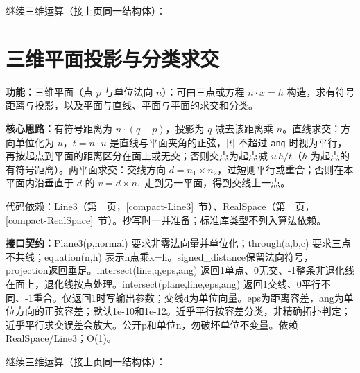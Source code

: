 

\newpage

\noindent 继续三维运算（接上页同一结构体）：



\section{三维平面投影与分类求交}\label{compact-Plane3}

\noindent\textbf{功能：}\allowbreak 三维平面（点 $p$ 与单位法向 $n$）：可由三点或方程 $n\cdot x=h$ 构造，求有符号距离与投影，以及平面与直线、平面与平面的求交和分类。

\textbf{核心思路：}\allowbreak 有符号距离为 $n\cdot(q-p)$，投影为 $q$ 减去该距离乘 $n$。直线求交：方向单位化为 $u$，$t=n\cdot u$ 是直线与平面夹角的正弦，$|t|$ 不超过 \texttt{ang} 时视为平行，再按起点到平面的距离区分在面上或无交；否则交点为起点减 $u\,h/t$（$h$ 为起点的有符号距离）。两平面求交：交线方向 $d=n_1\times n_2$，过短则平行或重合；否则在本平面内沿垂直于 $d$ 的 $v=d\times n_1$ 走到另一平面，得到交线上一点。

代码依赖：\hyperref[compact-Line3]{Line3}（第~\pageref{compact-Line3}~页，\ref{compact-Line3}~节）、\hyperref[compact-RealSpace]{RealSpace}（第~\pageref{compact-RealSpace}~页，\ref{compact-RealSpace}~节）。抄写时一并准备；标准库类型不列入算法依赖。

{\sloppy{}\noindent\textbf{接口契约：}Plane3(p,normal) 要求非零法向量并单位化；through(a,b,c) 要求三点不共线；equation(n,h) 表示n点乘x=h。signed\_distance保留法向符号，projection返回垂足。intersect(line,q,eps,ang) 返回1单点、0无交、-1整条非退化线在面上，退化线按点处理。intersect(plane,line,eps,ang) 返回1交线、0平行不同、-1重合。仅返回1时写输出参数；交线d为单位向量。eps为距离容差，ang为单位方向的正弦容差；默认1e-10和1e-12。近乎平行按容差分类，非精确拓扑判定；近乎平行求交误差会放大。公开p和单位n，勿破坏单位不变量。依赖RealSpace/Line3；O(1)。\par}



\newpage

\noindent 继续三维运算（接上页同一结构体）：



\Needspace{319pt}

